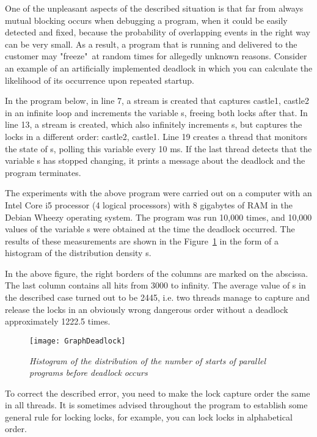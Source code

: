 {	\par One of the unpleasant aspects of the described situation is that far from always mutual blocking occurs when debugging a program, when it could be easily detected and fixed, because the probability of overlapping events in the right way can be very small. As a result, a program that is running and delivered to the customer may "freeze"\ at random times for allegedly unknown reasons. Consider an example of an artificially implemented deadlock in which you can calculate the likelihood of its occurrence upon repeated startup.
	\par In the program below, in line 7, a stream is created that captures castle1, castle2 in an infinite loop and increments the variable s, freeing both locks after that. In line 13, a stream is created, which also infinitely increments s, but captures the locks in a different order: castle2, castle1. Line 19 creates a thread that monitors the state of s, polling this variable every 10 ms. If the last thread detects that the variable s has stopped changing, it prints a message about the deadlock and the program terminates.
	\begin{figure}[H]
		
	\end{figure}
	\par The experiments with the above program were carried out on a computer with an Intel Core i5 processor (4 logical processors) with 8 gigabytes of RAM in the Debian Wheezy operating system. The program was run 10,000 times, and 10,000 values of the variable s were obtained at the time the deadlock occurred. The results of these measurements are shown in the Figure~\ref{GraphDeadlock:image} in the form of a histogram of the distribution density s.
	\par In the above figure, the right borders of the columns are marked on the abscissa. The last column contains all hits from 3000 to infinity. The average value of s in the described case turned out to be 2445, i.e. two threads manage to capture and release the locks in an obviously wrong dangerous order without a deadlock approximately 1222.5 times.
	\begin{figure}[H]
		\texttt{[image: GraphDeadlock]}
		\caption{\textit{Histogram of the distribution of the number of starts of parallel programs before deadlock occurs}}
		\label{GraphDeadlock:image}
	\end{figure}
	\par To correct the described error, you need to make the lock capture order the same in all threads. It is sometimes advised throughout the program to establish some general rule for locking locks, for example, you can lock locks in alphabetical order.
}
